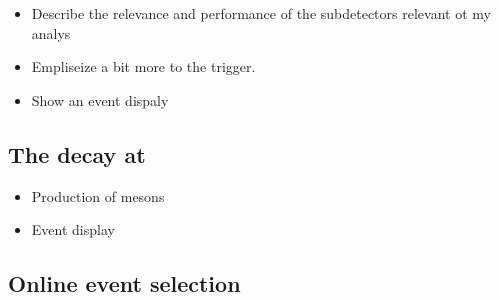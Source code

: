 

\begin{itemize}
  \item Describe the relevance and performance of the subdetectors relevant ot my analys
  \item Empliseize a bit more to the trigger.
  \item Show an event dispaly
\end{itemize}

\subsection{The \BsJpsiKst decay at \lhcb}

\begin{itemize}
  \item Production of \Bs mesons
  \item Event display
\end{itemize}

\subsection{Online event selection}
